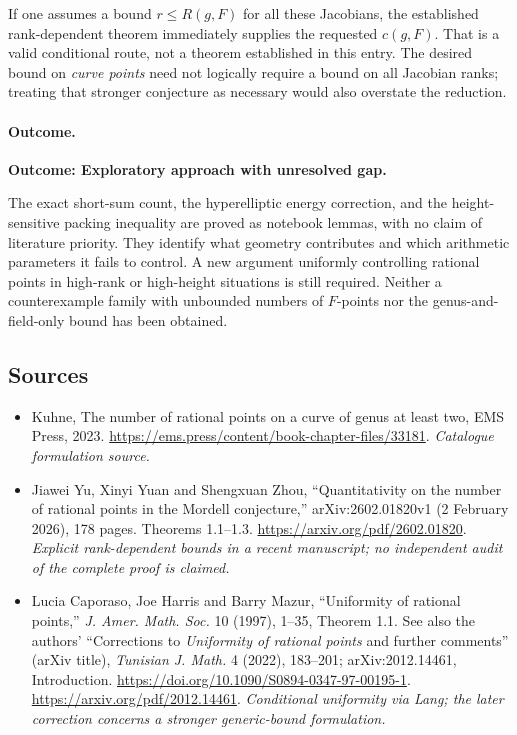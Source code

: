 \documentclass[11pt,a4paper]{article}
\numberwithin{equation}{section}
\begin{document}
If one assumes a bound $r\le R(g,F)$ for all these Jacobians, the
established rank-dependent theorem immediately supplies the requested
$c(g,F)$. That is a valid conditional route, not a theorem established
in this entry. The desired bound on \emph{curve points} need not logically
require a bound on all Jacobian ranks; treating that stronger conjecture
as necessary would also overstate the reduction.

\paragraph{Outcome.}
\textbf{Outcome: Exploratory approach with unresolved gap.}

The exact short-sum count, the hyperelliptic energy correction, and the
height-sensitive packing inequality are proved as notebook lemmas, with
no claim of literature priority. They identify what geometry contributes
and which arithmetic parameters it fails to control. A new argument
uniformly controlling rational points in high-rank or high-height
situations is still required. Neither a counterexample family with
unbounded numbers of $F$-points nor the genus-and-field-only bound has
been obtained.

\subsection{Sources}
\begin{itemize}\raggedright
\item[\textnormal{[S1]}]\hypertarget{source:164:1}{} Kuhne, The number of rational points on a curve of genus at least two, EMS Press, 2023.
\url{https://ems.press/content/book-chapter-files/33181}.
{\small\textit{Catalogue formulation source.}}
\item[\textnormal{[E1]}]\hypertarget{extra:164:1}{} Jiawei Yu, Xinyi Yuan and Shengxuan Zhou, ``Quantitativity on the number of rational points in the Mordell conjecture,'' arXiv:2602.01820v1 (2 February 2026), 178 pages. Theorems 1.1--1.3.
\url{https://arxiv.org/pdf/2602.01820}.
{\small\textit{Explicit rank-dependent bounds in a recent manuscript; no independent audit of the complete proof is claimed.}}
\item[\textnormal{[E2]}]\hypertarget{extra:164:2}{} Lucia Caporaso, Joe Harris and Barry Mazur, ``Uniformity of rational points,'' \emph{J. Amer. Math. Soc.} 10 (1997), 1--35, Theorem 1.1. See also the authors' ``Corrections to \emph{Uniformity of rational points} and further comments'' (arXiv title), \emph{Tunisian J. Math.} 4 (2022), 183--201; arXiv:2012.14461, Introduction.
\url{https://doi.org/10.1090/S0894-0347-97-00195-1}.
\url{https://arxiv.org/pdf/2012.14461}.
{\small\textit{Conditional uniformity via Lang; the later correction concerns a stronger generic-bound formulation.}}
\end{itemize}
\end{document}

